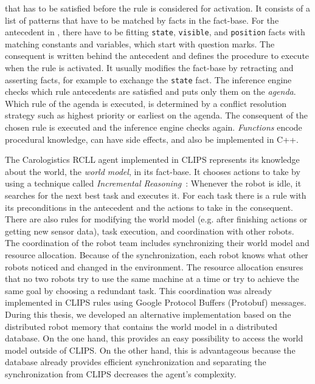 that has to be satisfied before the rule is considered for activation.
It consists of a list of patterns that have to be matched by facts in
the fact-base. For the antecedent in , there
have to be fitting \texttt{state}, \texttt{visible}, and
\texttt{position} facts with matching constants and variables, which
start with question marks. The consequent is written behind the
antecedent and defines the procedure to execute when the rule is
activated. It usually modifies the fact-base by retracting and
asserting facts, for example to exchange the \texttt{state} fact. The
inference engine checks which rule antecedents are satisfied and puts
only them on the \emph{agenda}. Which rule of the agenda is executed,
is determined by a conflict resolution strategy such as highest
priority or earliest on the agenda. The consequent of the chosen rule
is executed and the inference engine checks again. \emph{Functions}
encode procedural knowledge, can have side effects, and also be
implemented in C++.

The Carologistics RCLL agent implemented in CLIPS represents its
knowledge about the world, the \emph{world model}, in its
fact-base. It chooses actions to take by using a technique called
\emph{Incremental Reasoning}~\cite{CLIPS-Agent}: Whenever the robot is
idle, it searches for the next best task and executes it.  For each
task there is a rule with its preconditions in the antecedent and the
actions to take in the consequent. There are also rules for modifying
the world model (e.g. after finishing actions or getting new sensor
data), task execution, and coordination with other robots.  The
coordination of the robot team includes synchronizing their world
model and resource allocation. Because of the synchronization, each
robot knows what other robots noticed and changed in the
environment. The resource allocation ensures that no two robots try to
use the same machine at a time or try to achieve the same goal by
choosing a redundant task. This coordination was already implemented
in CLIPS rules using Google Protocol Buffers (Protobuf)
messages. During this thesis, we developed an alternative
implementation based on the distributed robot memory that contains the
world model in a distributed database. On the one hand, this provides
an easy possibility to access the world model outside of CLIPS. On the
other hand, this is advantageous
because the database already provides efficient synchronization and
separating the synchronization from CLIPS decreases the
agent's complexity.

